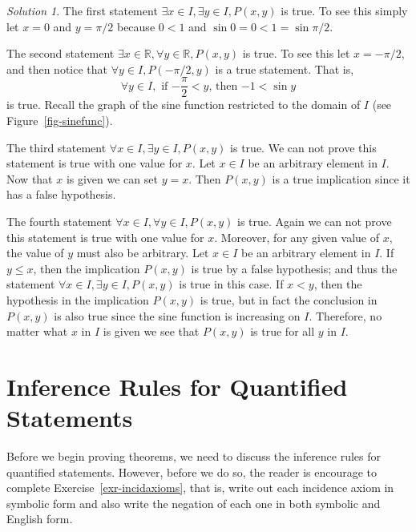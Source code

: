 \documentclass[
  letterpaper,
  10pt,
  reqno,
  twopage,
  openany]{book}
\theoremstyle{plain}
\theoremstyle{definition}
\theoremstyle{definition}
\theoremstyle{definition}
\theoremstyle{plain}
\theoremstyle{plain}
\theoremstyle{remark}
\newtheorem*{solution}{Solution}
\begin{document}
\begin{solution}

The first statement \(\exists x\in I, \exists y\in I, P(x,y)\) is true.
To see this simply let \(x=0\) and \(y=\pi/2\) because \(0<1\) and
\(\sin 0=0<1 =\sin \pi/2\).

The second statement
\(\exists x\in \mathbb{R}, \forall y\in \mathbb{R}, P(x,y)\) is true. To
see this let \(x=-\pi/2\), and then notice that
\(\forall y\in I, P(-\pi/2,y)\) is a true statement. That is, \[
\forall y\in I, \text{ if $-\frac{\pi}{2}<y$, then $-1<\sin y$}
\] is true. Recall the graph of the sine function restricted to the
domain of \(I\) (see Figure~\ref{fig-sinefunc}).

The third statement \(\forall x\in I, \exists y\in I, P(x,y)\) is true.
We can not prove this statement is true with one value for \(x\). Let
\(x\in I\) be an arbitrary element in \(I\). Now that \(x\) is given we
can set \(y=x\). Then \(P(x,y)\) is a true implication since it has a
false hypothesis.

The fourth statement \(\forall x\in I, \forall y\in I, P(x,y)\) is true.
Again we can not prove this statement is true with one value for \(x\).
Moreover, for any given value of \(x\), the value of \(y\) must also be
arbitrary. Let \(x\in I\) be an arbitrary element in \(I\). If
\(y\leq x\), then the implication \(P(x,y)\) is true by a false
hypothesis; and thus the statement
\(\forall x\in I, \exists y\in I, P(x,y)\) is true in this case. If
\(x<y\), then the hypothesis in the implication \(P(x,y)\) is true, but
in fact the conclusion in \(P(x,y)\) is also true since the sine
function is increasing on \(I\). Therefore, no matter what \(x\) in
\(I\) is given we see that \(P(x,y)\) is true for all \(y\) in \(I\).

\end{solution}

\hypertarget{inference-rules-for-quantified-statements}{%
\section{Inference Rules for Quantified
Statements}\label{inference-rules-for-quantified-statements}}

Before we begin proving theorems, we need to discuss the inference rules
for quantified statements. However, before we do so, the reader is
encourage to complete Exercise~\ref{exr-incidaxioms}, that is, write out
each incidence axiom in symbolic form and also write the negation of
each one in both symbolic and English form.
\end{document}
